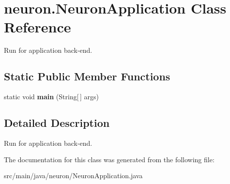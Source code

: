 \hypertarget{classneuron_1_1NeuronApplication}{}\section{neuron.\+Neuron\+Application Class Reference}
\label{classneuron_1_1NeuronApplication}


Run for application back-\/end.  


\subsection*{Static Public Member Functions}
\begin{DoxyCompactItemize}
\item 
\mbox{\label{classneuron_1_1NeuronApplication_a2a9a568e84534ac0ca1ce7e227b70ee8}} 
static void {\bfseries main} (String\mbox{[}$\,$\mbox{]} args)
\end{DoxyCompactItemize}


\subsection{Detailed Description}
Run for application back-\/end. 

The documentation for this class was generated from the following file\+:\begin{DoxyCompactItemize}
\item 
src/main/java/neuron/Neuron\+Application.\+java\end{DoxyCompactItemize}
